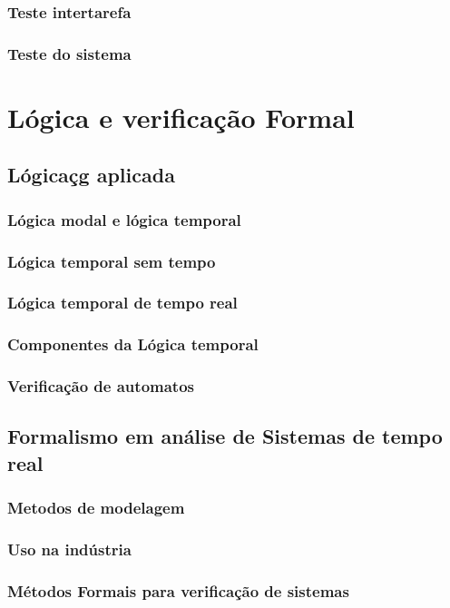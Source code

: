 \documentclass{article}
\begin{document}
		\subsubsection{Teste intertarefa}
		\subsubsection{Teste do sistema}
\newpage

\section{Lógica e verificação Formal}
	\subsection{Lógicaçg aplicada}
		\subsubsection{Lógica modal e lógica temporal}
		\subsubsection{Lógica temporal sem tempo}
		\subsubsection{Lógica temporal de tempo real}
		\subsubsection{Componentes da Lógica temporal}
		\subsubsection{Verificação de automatos}
	\subsection{Formalismo em análise de Sistemas de tempo real}
		\subsubsection{Metodos de modelagem}
		\subsubsection{Uso na indústria}
		\subsubsection{Métodos Formais para verificação de sistemas}
\end{document}
